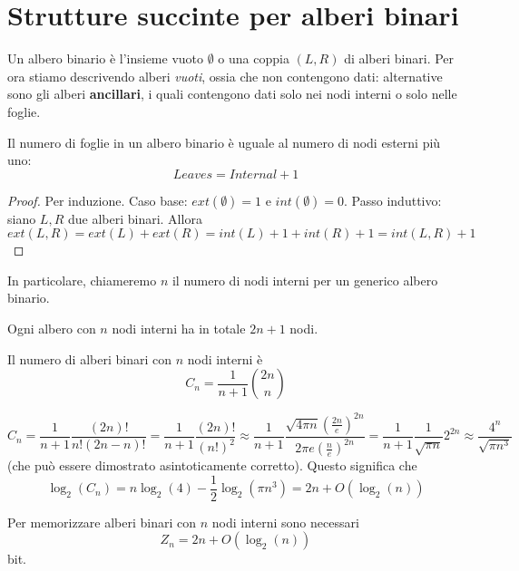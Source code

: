 \section{Strutture succinte per alberi binari}
Un albero binario è l'insieme vuoto $\emptyset$ o una coppia $(L, R)$ di alberi binari.
Per ora stiamo descrivendo alberi \textit{vuoti}, ossia che non contengono dati:
alternative sono gli alberi \textbf{ancillari}, i quali contengono dati solo nei nodi interni
o solo nelle foglie.
\begin{theorem} \label{thm:}
	Il numero di foglie in un albero binario è uguale al numero di nodi esterni più uno:
	$$
		Leaves = Internal + 1
	$$
\end{theorem}
\begin{proof}
	Per induzione.
	Caso base: $ext(\emptyset) = 1$ e $int(\emptyset) = 0$.
	Passo induttivo: siano $L, R$ due alberi binari. Allora
	$$
		ext(L,R) = ext(L) + ext(R) = int(L) + 1 + int(R) + 1 = int(L, R)  + 1
	$$
\end{proof}

In particolare, chiameremo $n$ il numero di nodi interni per un generico albero binario.
\begin{corollario}
	Ogni albero con $n$ nodi interni ha in totale $2n +1$ nodi.
\end{corollario}

\begin{theorem}\label{lem:ncatalano}
	Il numero di alberi binari con $n$ nodi interni è
	$$
		C_n = \frac{1}{n+1}{2n \choose n}
	$$
\end{theorem}


$$
	C_n = \frac{1}{n+1} \frac{(2n)!}{n! (2n - n)!} = \frac{1}{n+1}\frac{(2n)!}{(n!)^2} \approx
	\frac{1}{n+1} \frac{\sqrt{4 \pi n} (\frac{2n}{e})^{2n}}{2 \pi e (\frac{n}{e})^{2n}}
	= \frac{1}{n+1} \frac{1}{\sqrt{\pi n }} 2^{2n} \approx \frac{4^n}{\sqrt{\pi n^3}}
$$
(che può essere dimostrato asintoticamente corretto).
Questo significa che
$$
	\log_2(C_n) = n \log_2(4) - \frac{1}{2}\log_2(\pi n^3) = 2n + O(\log_2(n))
$$
\begin{corollario}
	Per memorizzare alberi binari con $n$ nodi interni sono necessari
	$$
		Z_n = 2n + O(\log_2(n))
	$$
	bit.
\end{corollario}

